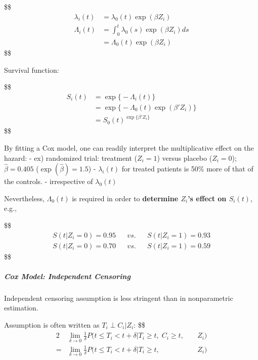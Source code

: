 \documentclass[
]{book}
\begin{document}
{{{\$\$
\begin{align}

\lambda_i (t) &= \lambda_0(t) \exp(\beta Z_i)
\\
\Lambda_i (t) &= \int_0^t \lambda_0(s) \exp(\beta Z_i) ds
\\
&= \Lambda_0(t) \exp(\beta Z_i)

\end{align}
\$\$

Survival function:

\$\$
\begin{align}
S_i (t) &= \exp \Big \{ -\Lambda_i (t) \Big\}
\\
&= \exp \Big \{ -\Lambda_0 (t) \exp(\beta ' Z_i)\Big\}
\\
&= S_0(t)^{\exp \Big \{ \beta'Z_i \Big\}}


\end{align}
\$\$

By fitting a Cox model, one can readily interpret the multiplicative effect on the hazard:
- ex) randomized trial: treatment (\(Z_i=1\)) versus placebo (\(Z_i=0\)); \(\hat \beta = 0.405\) (\(\exp(\hat \beta)=1.5\))
- \(\lambda_i(t)\) for treated patients is 50\% more of that of the controls.
- irrespective of \(\lambda_0(t)\)

Nevertheless, \(\Lambda_0(t)\) is required in order to \textbf{determine \(Z_i\)'s effect on \(S_i(t)\)}, e.g.,

\$\$
\begin{align}

S(t \Big | Z_i = 0) = 0.95 && vs. && S(t \Big | Z_i = 1) = 0.93


\\
S(t \Big | Z_i = 0) = 0.70 && vs. && S(t \Big | Z_i = 1) = 0.59



\end{align}
\$\$

\hypertarget{cox-model-independent-censoring}{%
\subparagraph{Cox Model: Independent Censoring}\label{cox-model-independent-censoring}}

Independent censoring assumption is less stringent than in nonparametric estimation.

Assumption is often written as \(T_i \perp C_i \Big \vert Z_i\):
\$\$
\begin{alignat}{2}

&\lim_{\delta \rightarrow 0} \frac{1}{\delta} P(t \le T_i < t+ \delta \Big | T_i \ge t , \; C_i \ge t , &&\; Z_i)
\\
= &\lim_{\delta \rightarrow 0} \frac{1}{\delta} P(t \le T_i < t+ \delta \Big | T_i \ge t ,  &&\; Z_i)


\end{alignat}}}}
\end{document}
